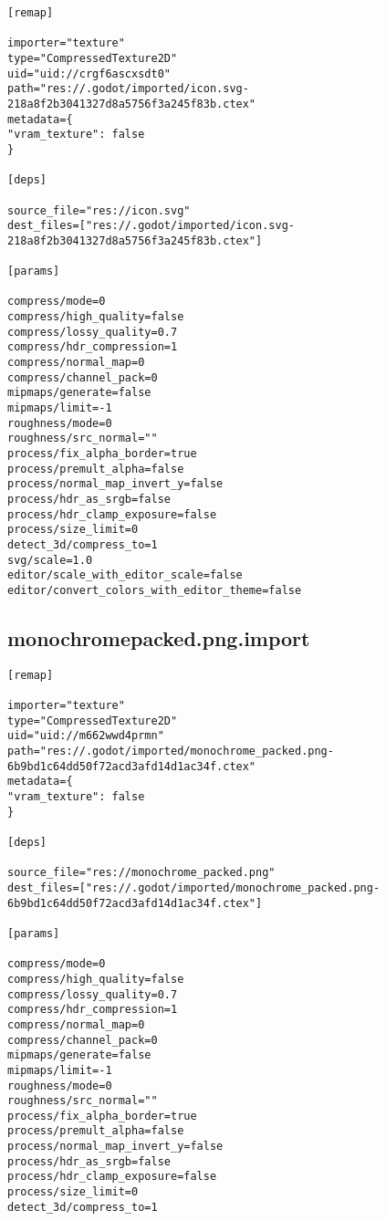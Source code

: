 \begin{lstlisting}
[remap]

importer="texture"
type="CompressedTexture2D"
uid="uid://crgf6ascxsdt0"
path="res://.godot/imported/icon.svg-218a8f2b3041327d8a5756f3a245f83b.ctex"
metadata={
"vram_texture": false
}

[deps]

source_file="res://icon.svg"
dest_files=["res://.godot/imported/icon.svg-218a8f2b3041327d8a5756f3a245f83b.ctex"]

[params]

compress/mode=0
compress/high_quality=false
compress/lossy_quality=0.7
compress/hdr_compression=1
compress/normal_map=0
compress/channel_pack=0
mipmaps/generate=false
mipmaps/limit=-1
roughness/mode=0
roughness/src_normal=""
process/fix_alpha_border=true
process/premult_alpha=false
process/normal_map_invert_y=false
process/hdr_as_srgb=false
process/hdr_clamp_exposure=false
process/size_limit=0
detect_3d/compress_to=1
svg/scale=1.0
editor/scale_with_editor_scale=false
editor/convert_colors_with_editor_theme=false
\end{lstlisting}

\subsection{monochrome\textunderscore{}packed.png.import}

\begin{lstlisting}
[remap]

importer="texture"
type="CompressedTexture2D"
uid="uid://m662wwd4prmn"
path="res://.godot/imported/monochrome_packed.png-6b9bd1c64dd50f72acd3afd14d1ac34f.ctex"
metadata={
"vram_texture": false
}

[deps]

source_file="res://monochrome_packed.png"
dest_files=["res://.godot/imported/monochrome_packed.png-6b9bd1c64dd50f72acd3afd14d1ac34f.ctex"]

[params]

compress/mode=0
compress/high_quality=false
compress/lossy_quality=0.7
compress/hdr_compression=1
compress/normal_map=0
compress/channel_pack=0
mipmaps/generate=false
mipmaps/limit=-1
roughness/mode=0
roughness/src_normal=""
process/fix_alpha_border=true
process/premult_alpha=false
process/normal_map_invert_y=false
process/hdr_as_srgb=false
process/hdr_clamp_exposure=false
process/size_limit=0
detect_3d/compress_to=1
\end{lstlisting}

